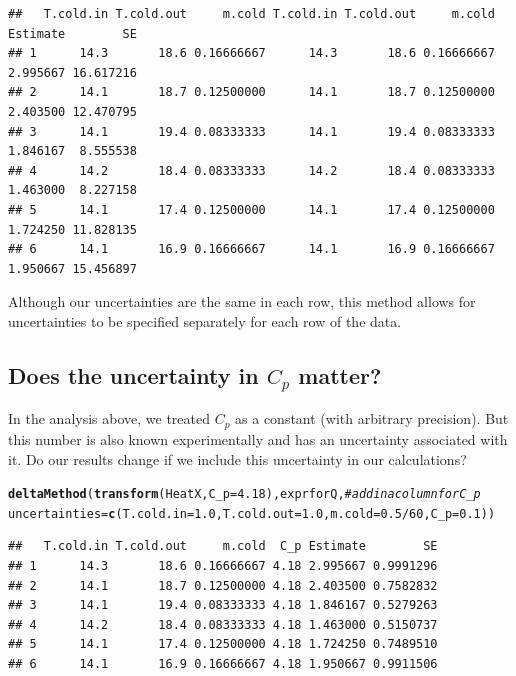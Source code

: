 \documentclass[twoside]{book}\usepackage[]{graphicx}\usepackage[]{xcolor}
\makeatletter
\newcommand{\hlnum}[1]{\textcolor[rgb]{0.686,0.059,0.569}{#1}}%
\newcommand{\hlcom}[1]{\textcolor[rgb]{0.678,0.584,0.686}{\textit{#1}}}%
\newcommand{\hlopt}[1]{\textcolor[rgb]{0,0,0}{#1}}%
\newcommand{\hlstd}[1]{\textcolor[rgb]{0.345,0.345,0.345}{#1}}%
\newcommand{\hlkwc}[1]{\textcolor[rgb]{0.333,0.667,0.333}{#1}}%
\newcommand{\hlkwd}[1]{\textcolor[rgb]{0.737,0.353,0.396}{\textbf{#1}}}%
\newenvironment{kframe}{%
 \def\at@end@of@kframe{}%
 \ifinner\ifhmode%
  \def\at@end@of@kframe{\end{minipage}}%
  \begin{minipage}{\columnwidth}%
 \fi\fi%
 \def\FrameCommand##1{\hskip\@totalleftmargin \hskip-\fboxsep
 \colorbox{shadecolor}{##1}\hskip-\fboxsep
     \hskip-\linewidth \hskip-\@totalleftmargin \hskip\columnwidth}%
 \MakeFramed {\advance\hsize-\width
   \@totalleftmargin\z@ \linewidth\hsize
   \@setminipage}}%
 {\par\unskip\endMakeFramed%
 \at@end@of@kframe}
\newenvironment{knitrout}{}{} %
\makeatother
\begin{document}
\begin{knitrout}
\begin{kframe}
{\ttfamily\noindent\itshape\color{messagecolor}{\#\# Converting uncertainties to a covariance matrix assuming independence ...}}\begin{verbatim}
##   T.cold.in T.cold.out     m.cold T.cold.in T.cold.out     m.cold Estimate        SE
## 1      14.3       18.6 0.16666667      14.3       18.6 0.16666667 2.995667 16.617216
## 2      14.1       18.7 0.12500000      14.1       18.7 0.12500000 2.403500 12.470795
## 3      14.1       19.4 0.08333333      14.1       19.4 0.08333333 1.846167  8.555538
## 4      14.2       18.4 0.08333333      14.2       18.4 0.08333333 1.463000  8.227158
## 5      14.1       17.4 0.12500000      14.1       17.4 0.12500000 1.724250 11.828135
## 6      14.1       16.9 0.16666667      14.1       16.9 0.16666667 1.950667 15.456897
\end{verbatim}
\end{kframe}
\end{knitrout}
Although our uncertainties are the same in each row, this method allows for uncertainties 
to be specified separately for each row of the data.

\subsection{Does the uncertainty in $C_p$ matter?}

In the analysis above, we treated $C_p$ as a constant (with arbitrary precision).  
But this number is also known experimentally and has an uncertainty associated with it.
Do our results change if we include this uncertainty in our calculations?

\begin{knitrout}
\color{fgcolor}\begin{kframe}
\begin{alltt}
\hlkwd{deltaMethod}\hlstd{(} \hlkwd{transform}\hlstd{(HeatX,} \hlkwc{C_p} \hlstd{=} \hlnum{4.18}\hlstd{), exprforQ,}      \hlcom{# add in a column for C_p}
  \hlkwc{uncertainties}\hlstd{=}\hlkwd{c}\hlstd{(}\hlkwc{T.cold.in}\hlstd{=}\hlnum{1.0}\hlstd{,} \hlkwc{T.cold.out}\hlstd{=}\hlnum{1.0}\hlstd{,} \hlkwc{m.cold} \hlstd{=} \hlnum{0.5}\hlopt{/}\hlnum{60}\hlstd{,} \hlkwc{C_p} \hlstd{=} \hlnum{0.1}\hlstd{) )}
\end{alltt}


{\ttfamily\noindent\itshape\color{messagecolor}{\#\# Converting uncertainties to a covariance matrix assuming independence ...}}\begin{verbatim}
##   T.cold.in T.cold.out     m.cold  C_p Estimate        SE
## 1      14.3       18.6 0.16666667 4.18 2.995667 0.9991296
## 2      14.1       18.7 0.12500000 4.18 2.403500 0.7582832
## 3      14.1       19.4 0.08333333 4.18 1.846167 0.5279263
## 4      14.2       18.4 0.08333333 4.18 1.463000 0.5150737
## 5      14.1       17.4 0.12500000 4.18 1.724250 0.7489510
## 6      14.1       16.9 0.16666667 4.18 1.950667 0.9911506
\end{verbatim}
\end{kframe}
\end{knitrout}
\end{document}
